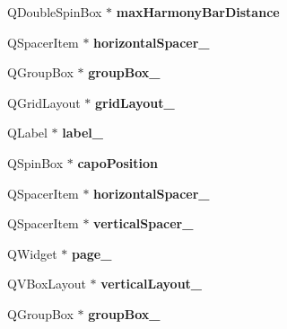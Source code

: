 \begin{DoxyCompactItemize}
Q\+Double\+Spin\+Box $\ast$ {\bfseries max\+Harmony\+Bar\+Distance}
\item 
\mbox{\label{class_ui___edit_style_base_aed0622ff76830defd411dd435d31cfce}} 
Q\+Spacer\+Item $\ast$ {\bfseries horizontal\+Spacer\+\_}
\item 
\mbox{\label{class_ui___edit_style_base_a233b147d553cf44b80ae11a00ed9e5dc}} 
Q\+Group\+Box $\ast$ {\bfseries group\+Box\+\_}
\item 
\mbox{\label{class_ui___edit_style_base_a604021454c17a438af15c8d967c82c2e}} 
Q\+Grid\+Layout $\ast$ {\bfseries grid\+Layout\+\_}
\item 
\mbox{\label{class_ui___edit_style_base_aa16eaf3afc5e84a22ceb9d1d7ad4d1e5}} 
Q\+Label $\ast$ {\bfseries label\+\_}
\item 
\mbox{\label{class_ui___edit_style_base_a51d0afd54e166a329171e9e4c1d6f7bb}} 
Q\+Spin\+Box $\ast$ {\bfseries capo\+Position}
\item 
\mbox{\label{class_ui___edit_style_base_ad3d13f047702108a40405156063a0563}} 
Q\+Spacer\+Item $\ast$ {\bfseries horizontal\+Spacer\+\_}
\item 
\mbox{\label{class_ui___edit_style_base_a7b6586be84104392ba9e824cfdc8b0ea}} 
Q\+Spacer\+Item $\ast$ {\bfseries vertical\+Spacer\+\_}
\item 
\mbox{\label{class_ui___edit_style_base_a45bccb7a0ad448c479a2fc0c2f6b8033}} 
Q\+Widget $\ast$ {\bfseries page\+\_}
\item 
\mbox{\label{class_ui___edit_style_base_a7c9ab8d41775cfafa0945b62195b9626}} 
Q\+V\+Box\+Layout $\ast$ {\bfseries vertical\+Layout\+\_}
\item 
\mbox{\label{class_ui___edit_style_base_ab375f3712cb2d1bf9c659190713c0d71}} 
Q\+Group\+Box $\ast$ {\bfseries group\+Box\+\_}
\item 

\end{DoxyCompactItemize}
